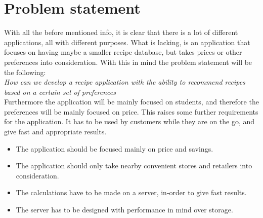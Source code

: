 \section{Problem statement}
\label{sec:probstate}

With all the before mentioned info, it is clear that there is a lot of different applications, all with different purposes. What is lacking, is an application that focuses on having maybe a smaller recipe database, but takes prices or other preferences into consideration. With this in mind the problem statement will be the following: \\


\emph{How can we develop a recipe application with the ability to recommend recipes based on a certain set of preferences} \\


Furthermore the application will be mainly focused on students, and therefore the preferences will be mainly focused on price. This raises some further requirements for the application. It has to be used by customers while they are on the go, and give fast and appropriate results.

\begin{itemize}
\item The application should be focused mainly on price and savings.
\item The application should only take nearby convenient stores and retailers into consideration.
\item The calculations have to be made on a server, in-order to give fast results.
\item The server has to be designed with performance in mind over storage.
\end{itemize}



